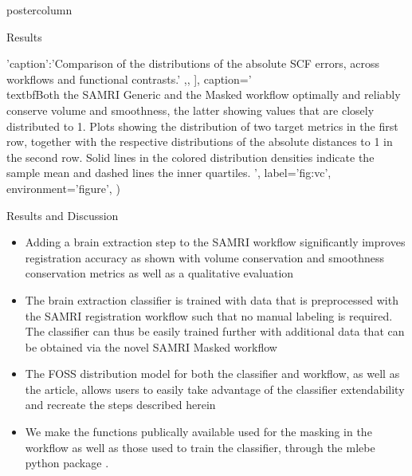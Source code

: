 \begin{frame}
\begin{columns}
\begin{column}{.59\textwidth}
\begin{beamercolorbox}[center]{postercolumn}
\begin{minipage}{.98\textwidth}
{\begin{myblock}{Results}
\begin{sansmath}
{{                                        'caption':'Comparison of the distributions of the absolute SCF errors, across workflows and functional contrasts.'
                                        ,},
                                        ],
                                        caption='\\textbf{Both the SAMRI Generic and the Masked workflow optimally and reliably conserve volume and smoothness, the latter showing values that are closely distributed to 1.}
                                        Plots showing the distribution of two target metrics in the first row, together with the respective distributions of the absolute distances to 1 in the second row. Solid lines in the colored distribution densities indicate the sample mean and dashed lines the inner quartiles.
                                        ',
                                        label='fig:vc',
	                                environment='figure',
                                        )}
                                \end{sansmath}
                            \end{myblock}

                            \begin{myblock}{Results and Discussion}
                                \begin{itemize}
                                    \item Adding a brain extraction step to the SAMRI workflow significantly improves registration accuracy as shown with volume conservation and smoothness conservation metrics as well as a qualitative evaluation
                                    \item The brain extraction classifier is trained with data that is preprocessed with the SAMRI registration workflow such that no manual labeling is required.
                                    The classifier can thus be easily trained further with additional data that can be obtained via the novel SAMRI Masked workflow
                                    \item The FOSS distribution model for both the classifier and workflow, as well as the article, allows users to easily take advantage of the classifier extendability and recreate the steps described herein
                                    \item We make the functions publically available used for the masking in the workflow as well as those used to train the classifier, through the \textcolor{mg}{mlebe} python package \cite{mlebe}.


\end{itemize}
\end{myblock}}
\end{minipage}
\end{beamercolorbox}
\end{column}
\end{columns}
\end{frame}
